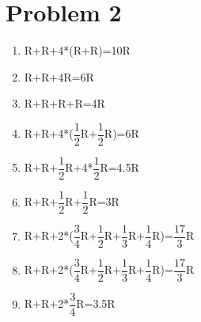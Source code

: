 \documentclass[11pt]{article}
\begin{document}
\pagestyle{plain}
\section*{Problem 2}
\begin{enumerate}
\item R+R+4*(R+R)=10R
\item R+R+4R=6R
\item R+R+R+R=4R
\item R+R+4*($\dfrac{1}{2}$R+$\dfrac{1}{2}$R)=6R
\item R+R+$\dfrac{1}{2}$R+4*$\dfrac{1}{2}$R=4.5R
\item R+R+$\dfrac{1}{2}$R+$\dfrac{1}{2}$R=3R
\item R+R+2*($\dfrac{3}{4}$R+$\dfrac{1}{2}$R+$\dfrac{1}{3}$R+$\dfrac{1}{4}$R)=$\dfrac{17}{3}$R
\item R+R+2*($\dfrac{3}{4}$R+$\dfrac{1}{2}$R+$\dfrac{1}{3}$R+$\dfrac{1}{4}$R)=$\dfrac{17}{3}$R
\item R+R+2*$\dfrac{3}{4}$R=3.5R
\end{enumerate}
\label{pg:end-of-p2}


%
\newpage
\end{document}
